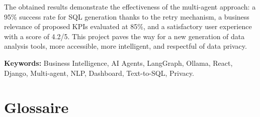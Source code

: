 \documentclass{rapportENSIAS}
\begin{document}
The obtained results demonstrate the effectiveness of the multi-agent approach: a 95\% success rate for SQL generation thanks to the retry mechanism, a business relevance of proposed KPIs evaluated at 85\%, and a satisfactory user experience with a score of 4.2/5. This project paves the way for a new generation of data analysis tools, more accessible, more intelligent, and respectful of data privacy.

\textbf{Keywords:} Business Intelligence, AI Agents, LangGraph, Ollama, React, Django, Multi-agent, NLP, Dashboard, Text-to-SQL, Privacy.
\newpage
\tableofcontents
\newpage
\listoffigures
{}

\listoftables
{}




\newpage

\chapter*{Glossaire}
\end{document}
